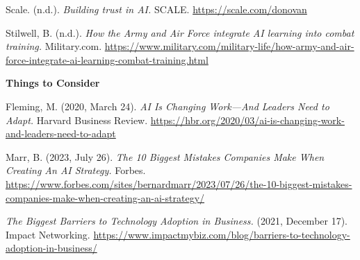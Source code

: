 \documentclass[
]{article}
\begin{document}
Scale. (n.d.). \emph{Building trust in AI.} SCALE. \url{https://scale.com/donovan}

Stilwell, B. (n.d.). \emph{How the Army and Air Force integrate AI learning into combat training.} Military.com. \url{https://www.military.com/military-life/how-army-and-air-force-integrate-ai-learning-combat-training.html}

\textbf{Things to Consider}

Fleming, M. (2020, March 24). \emph{AI Is Changing Work---And Leaders Need to Adapt.} Harvard Business Review. \url{https://hbr.org/2020/03/ai-is-changing-work-and-leaders-need-to-adapt}

Marr, B. (2023, July 26). \emph{The 10 Biggest Mistakes Companies Make When Creating An AI Strategy.} Forbes. \url{https://www.forbes.com/sites/bernardmarr/2023/07/26/the-10-biggest-mistakes-companies-make-when-creating-an-ai-strategy/}

\emph{The Biggest Barriers to Technology Adoption in Business.} (2021, December 17). Impact Networking. \url{https://www.impactmybiz.com/blog/barriers-to-technology-adoption-in-business/}
\end{document}
